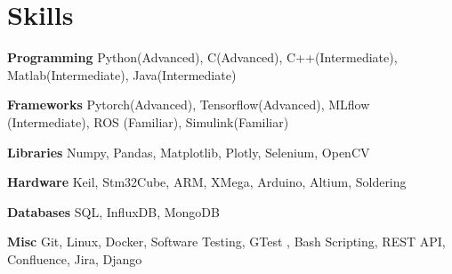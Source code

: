 
\section{Skills}
  \vspace{2pt}
  \resumeSubHeadingListStart
    \small{\item{

    \textbf{\color{MidnightBlue}Programming}{ Python(Advanced), C(Advanced), C++(Intermediate), Matlab(Intermediate), Java(Intermediate)} \\ \vspace{3pt}

    \textbf{\color{MidnightBlue}Frameworks}{ Pytorch(Advanced), Tensorflow(Advanced), MLflow (Intermediate)}, ROS (Familiar), Simulink(Familiar)\\ \vspace{3pt}

    \textbf{\color{MidnightBlue}Libraries}{ Numpy, Pandas, Matplotlib, Plotly, Selenium, OpenCV} \\ \vspace{3pt}

    \textbf{\color{MidnightBlue}Hardware}{ Keil, Stm32Cube, ARM, XMega, Arduino, Altium, Soldering} \\ \vspace{3pt}

    \textbf{\color{MidnightBlue}Databases}{ SQL, InfluxDB, MongoDB} \\ \vspace{3pt}

    \textbf{\color{MidnightBlue}Misc}{ Git, Linux, Docker, Software Testing, GTest , Bash Scripting, REST API, Confluence, Jira, Django} \\ \vspace{3pt}
            
    }}
  \resumeSubHeadingListEnd
